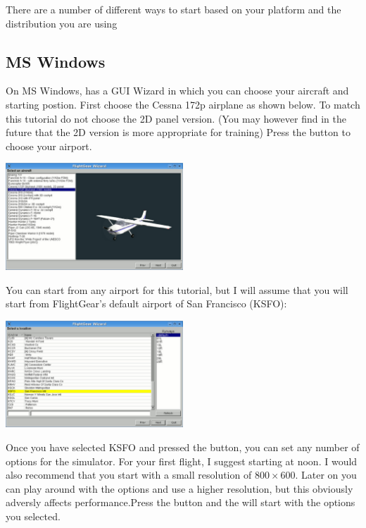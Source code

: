 There are a number of different ways to start \FlightGear{} based on your
platform and the distribution you are using

\subsection{MS Windows}
    
On MS Windows, \FlightGear{} has a GUI Wizard in which you can choose your
aircraft and starting postion. First choose the Cessna 172p airplane as shown 
below. To match this tutorial do not choose the 2D panel version. 
(You may however find in the future that the 2D version is more appropriate 
for training) Press the  button to choose your airport.

\begin{center}
\includegraphics[width=0.5\textwidth]{img/tut_2}
\end{center}
    
You can start from any airport for this tutorial, but I will assume that you 
will start from FlightGear's default airport of San Francisco (KSFO):

\begin{center}
\includegraphics[width=0.5\textwidth]{img/tut_3}
\end{center}

Once you have selected KSFO and pressed the  button, you can set
any number of options for the simulator. For your first flight, I suggest
starting at noon. I would also recommend that you start with a small resolution
of $800\times600$. Later on you can play around with the options and use a
higher resolution, but this obviously adversly affects performance.Press the 
 button and the \FlightGear{} will start with the options you 
selected.

